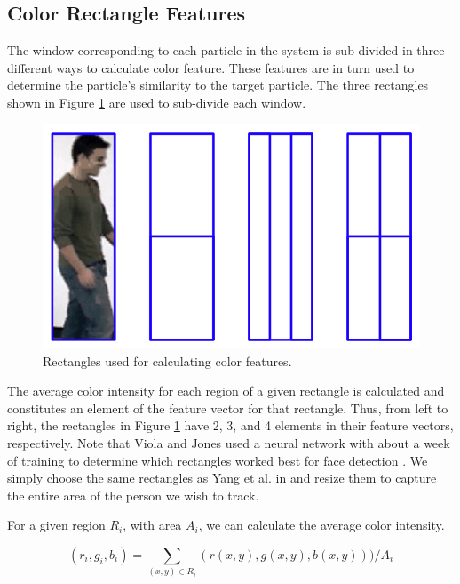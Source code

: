 \documentclass[11pt]{article}
\begin{document}
\subsection{Color Rectangle Features}
\label{sec:colorrects}

The window corresponding to each particle in the system is sub-divided in three different ways to calculate color feature. These features are in turn used to determine the particle's similarity to the target particle. The three rectangles shown in Figure \ref{fig:rectfeatures} are used to sub-divide each window.

\begin{figure}[H]
\centering
\includegraphics[scale=.4]{img/RectFeatures.jpg}
\caption{Rectangles used for calculating color features.}
\label{fig:rectfeatures}
\end{figure}

The average color intensity for each region of a given rectangle is calculated and constitutes an element of the feature vector for that rectangle. Thus, from left to right, the rectangles in Figure \ref{fig:rectfeatures} have 2, 3, and 4 elements in their feature vectors, respectively. Note that Viola and Jones used a neural network with about a week of training to determine which rectangles worked best for face detection \cite{facedetection}. We simply choose the same rectangles as Yang et al. in \cite{hybrid} and resize them to capture the entire area of the person we wish to track.

For a given region $R_i$, with area $A_i$, we can calculate the average color intensity.

\begin{equation}
(r_i,g_i,b_i) = \sum_{(x,y) \in R_i} (r(x,y), g(x,y), b(x,y))) / A_i
\label{eq:colorregionsum}
\end{equation}
\end{document}

